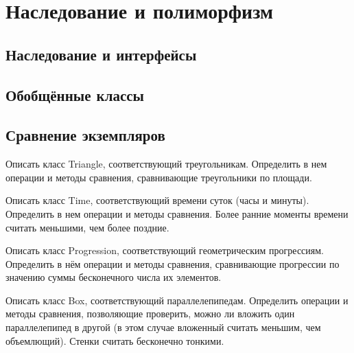\section{Наследование и полиморфизм}

\subsection{Наследование и интерфейсы}

\task

\task

\task 

\task 

\task 

\task 

\task 

\task 

\task 

\task 

\subsection{Обобщённые классы}

\task 

\task 

\task 

\task 

\task 

\task 

\task 

\task 

\task 

\subsection{Сравнение экземпляров}

\task Описать класс Triangle, соответствующий треугольникам.
Определить в нем операции и методы сравнения, сравнивающие
треугольники по площади.

\task Описать класс Time, соответствующий времени суток (часы и
минуты). Определить в нем операции и методы сравнения. Более ранние
моменты времени считать меньшими, чем более поздние.

\task Описать класс Progression, соответствующий геометрическим
прогрессиям. Определить в нём операции и методы сравнения,
сравнивающие прогрессии по значению суммы бесконечного числа их
элементов.

\task Описать класс Box, соответствующий параллелепипедам. Определить
операции и методы сравнения, позволяющие проверить, можно ли вложить
один параллелепипед в другой (в этом случае вложенный считать меньшим,
чем объемлющий). Стенки считать бесконечно тонкими.

